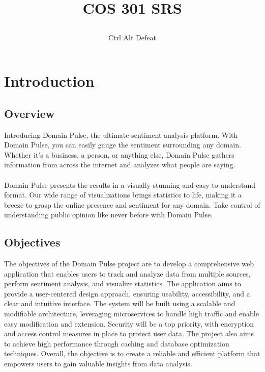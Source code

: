\documentclass[12pt]{article}
\title{

\\
{COS 301 SRS}
}
\author{Ctrl Alt Defeat}
\begin{document}


\tableofcontents

\newpage











\section{Introduction}

\subsection{Overview}
Introducing Domain Pulse, the ultimate sentiment analysis platform. With Domain Pulse, you can easily gauge the sentiment surrounding any domain. Whether it's a business, a person, or anything else, Domain Pulse gathers information from across the internet and analyzes what people are saying.\\
\\Domain Pulse presents the results in a visually stunning and easy-to-understand format. Our wide range of visualizations brings statistics to life, making it a breeze to grasp the online presence and sentiment for any domain. Take control of understanding public opinion like never before with Domain Pulse.
\subsection{Objectives}

The objectives of the Domain Pulse project are to develop a comprehensive web application that enables users to track and analyze data from multiple sources, perform sentiment analysis, and visualize statistics. The application aims to provide a user-centered design approach, ensuring usability, accessibility, and a clear and intuitive interface. The system will be built using a scalable and modifiable architecture, leveraging microservices to handle high traffic and enable easy modification and extension. Security will be a top priority, with encryption and access control measures in place to protect user data. The project also aims to achieve high performance through caching and database optimization techniques. Overall, the objective is to create a reliable and efficient platform that empowers users to gain valuable insights from data analysis.

\newpage
\end{document}
